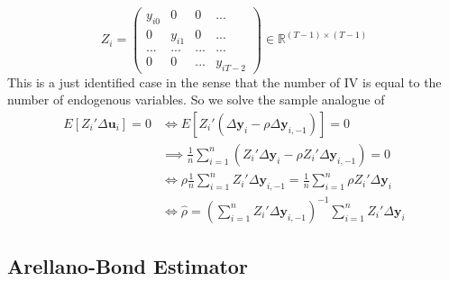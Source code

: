 \documentclass[12pt]{article}
\theoremstyle{definition}
\theoremstyle{property}
\theoremstyle{assumption}
\theoremstyle{example}
\theoremstyle{comment}
\begin{document}
\[
Z_i = \begin{pmatrix}y_{i0}& 0 & 0 & ... \\ 0 & y_{i1}& 0 & ... \\ ... & ... &...&...\\ 0 & 0 & ... & y_{iT-2} \end{pmatrix}\in\mathbb{R}^{(T-1)\times (T-1)}
\]
This is a just identified case in the sense that the number of IV is equal to the number of endogenous variables. So we solve the sample analogue of
\begin{align*}
E[Z_i'\Delta \mathbf{u}_i]=0&\iff E[Z_i'(\Delta \mathbf{y}_i - \rho\Delta\mathbf{y}_{i,-1})]=0\\
&\implies \frac{1}{n}\sum_{i=1}^n(Z_i'\Delta \mathbf{y}_i - \rho Z_i'\Delta \mathbf{y}_{i,-1})=0\\
&\iff \rho \frac{1}{n}\sum_{i=1}^n  Z_i'\Delta \mathbf{y}_{i,-1}=  \frac{1}{n}\sum_{i=1}^n \rho Z_i'\Delta \mathbf{y}_{i}\\
&\iff \hat{\rho}=\left(\sum_{i=1}^n  Z_i'\Delta \mathbf{y}_{i,-1}\right)^{-1}\sum_{i=1}^n  Z_i'\Delta \mathbf{y}_{i}
\end{align*} 
\subsection{Arellano-Bond Estimator}
\end{document}
